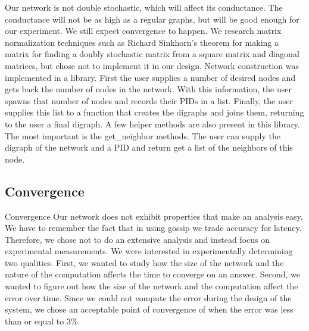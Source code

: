 Our network is not double stochastic, which will affect its conductance. The conductance will not be as high as a regular graphs, but will be good enough for our experiment. We still expect convergence to happen. We research matrix normalization techniques such as Richard Sinkhorn’s theorem for making a matrix for finding a doubly stochastic matrix from a square matrix and diagonal matrices, but chose not to implement it in our design.
Network construction was implemented in a library. First the user supplies a number of desired nodes and gets back the number of nodes in the network. With this information, the user spawns that number of nodes and records their PIDs in a list. Finally, the user supplies this list to a function that creates the digraphs and joins them, returning to the user a final digraph. A few helper methods are also present in this library. The most important is the get\_neighbor methods. The user can supply the digraph of the network and a PID and return get a list of the neighbors of this node. 

\subsection{Convergence}
Convergence
Our network does not exhibit properties that make an analysis easy. We have to remember the fact that in using gossip we trade accuracy for latency. Therefore, we chose not to do an extensive analysis and instead focus on experimental measurements. We were interested in experimentally determining two qualities. First, we wanted to study how the size of the network and the nature of the computation affects the time to converge on an answer. Second, we wanted to figure out how the size of the network and the computation affect the error over time. Since we could not compute the error during the design of the system, we chose an acceptable point of convergence of when the error was less than or equal to 3\%. 

